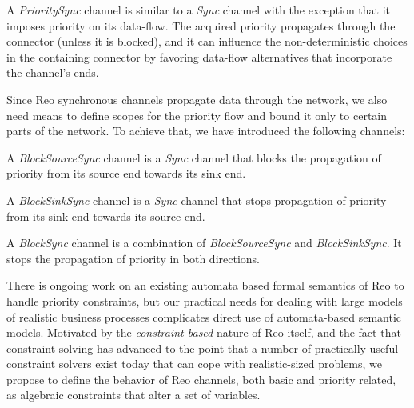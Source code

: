  {\psync}  A \emph{PrioritySync} channel is similar to a \emph{Sync} channel with the exception that it imposes priority on its data-flow. The acquired priority propagates through the connector (unless it is blocked), and it can influence the non-deterministic choices in the containing connector by favoring data-flow alternatives that incorporate the channel's ends. 

Since Reo synchronous channels propagate data through the network, we also need means to define scopes for the priority flow and bound it only to certain parts of the network. To achieve that, we have introduced the following channels:

  {\bcsync}  A \emph{BlockSourceSync} channel is a  \emph{Sync} channel that blocks the propagation of priority from its source end towards its sink end. 

 {\bksync}   A \emph{BlockSinkSync}  channel is a  \emph{Sync} channel that stops  propagation of priority from its sink end towards its source end.

  {\bsync}  A \emph{BlockSync}  channel is a combination of \emph{BlockSourceSync} and \emph{BlockSinkSync}. It stops the propagation of priority in both directions.

There is ongoing work on an existing automata based formal semantics of Reo to handle priority constraints, but our practical needs for dealing with large models of realistic business processes complicates direct use of automata-based semantic models. Motivated by the \emph{constraint-based} nature of Reo itself, and the fact that constraint solving has advanced to the point that a number of practically useful constraint solvers exist today that can cope with realistic-sized problems, we propose to define the behavior of Reo channels, both basic and priority related, as algebraic constraints that alter a set of variables.

